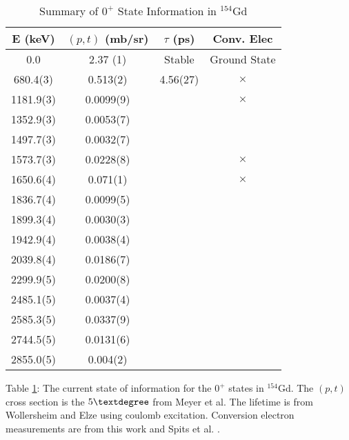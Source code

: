 \begin{table}
    \centering
\begin{threeparttable}
    \centering
    \caption{Summary of $0^+$ State Information in $^{154}$Gd}
    \label{tab:154gd_summary}
    \begin{tabular}{c|c|c|c}
        E (keV) & $(p,t)$ (mb/sr)\citep{meyer06:_zeroplus} & $\tau$ (ps) & Conv. Elec \\
        \toprule
        0.0 & 2.37 (1) & Stable & Ground State \\
        680.4(3) & 0.513(2) & 4.56(27) & $\times$ \\
        1181.9(3) & 0.0099(9) & & $\times$ \\
        1352.9(3) & 0.0053(7) & & \\
        1497.7(3) & 0.0032(7) & & \\
        1573.7(3) & 0.0228(8) & & $\times$ \\
        1650.6(4) & 0.071(1) & & $\times$ \\
        1836.7(4) & 0.0099(5) & & \\
        1899.3(4) & 0.0030(3) & & \\
        1942.9(4) & 0.0038(4) & & \\
        2039.8(4) & 0.0186(7) & & \\
        2299.9(5) & 0.0200(8) & & \\
        2485.1(5) & 0.0037(4) & & \\
        2585.3(5) & 0.0337(9) & & \\
        2744.5(5) & 0.0131(6) & & \\
        2855.0(5) & 0.004(2) & & \\
        \bottomrule
    \end{tabular}
    \begin{tablenotes}[para]
        Table \ref{tab:154gd_summary}: The current state of information for the $0^+$ states in $^{154}$Gd. The $(p,t)$ cross section is the $5\textdegree$ from Meyer et al\citep{meyer06:_zeroplus}. The lifetime is from Wollersheim and Elze using coulomb excitation\citep{wollersheim77:_154_tau}. Conversion electron measurements are from this work and Spits et al. \citep{spits96:_154gd}.
    \end{tablenotes}
\end{threeparttable}
\end{table}